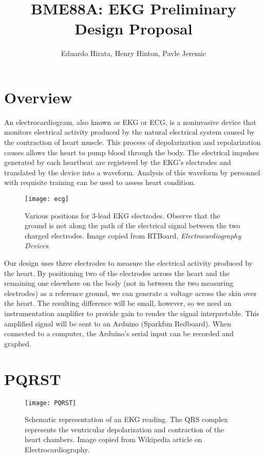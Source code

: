 \documentclass[11pt, oneside]{article}   	%
\title{BME88A: EKG Preliminary Design Proposal}
\author{Eduardo Hirata, Henry Hinton, Pavle Jeremic}
\begin{document}
\maketitle
\section{Overview}
	
	\onehalfspace

\par An electrocardiogram, also known as EKG or ECG, is a noninvasive device that monitors electrical activity produced by the natural electrical system caused by the contraction of heart muscle. This process of depolarization and repolarization causes allows the heart to pump blood through the body. The electrical impulses generated by each heartbeat are registered by the EKG's electrodes and translated by the device into a waveform. Analysis of this waveform by personnel with requisite training can be used to assess heart condition.
 

\begin{SCfigure}[][htb!]
	\texttt{[image: ecg]}
	\caption{Various positions for 3-lead EKG electrodes. Observe that the ground is not along the path of the electrical signal between the two charged electrodes. \cite{ecgpos} Image copied from RTBoard, \textit{Electrocardiography Devices}.}
\end{SCfigure}

\par Our design uses three electrodes to measure the electrical activity produced by the heart. By positioning two of the electrodes across the heart and the remaining one elsewhere on the body (not in between the two measuring electrodes) as a reference ground, we can generate a voltage across the skin over the heart. The resulting difference will be small, however, so we need an instrumentation amplifier to provide gain to render the signal interpretable. This amplified signal will be sent to an Arduino (Sparkfun Redboard). When connected to a computer, the Arduino's serial input can be recorded and graphed.

\section{PQRST}

\begin{SCfigure}[][htb!]
	\texttt{[image: PQRST]}
	\caption{Schematic representation of an EKG reading.  The QRS complex represents the ventricular depolarization and contraction of the heart chambers. \cite{wikiimage} Image copied from Wikipedia article on Electrocardiography.}
\end{SCfigure}
	\onehalfspace
\end{document}
